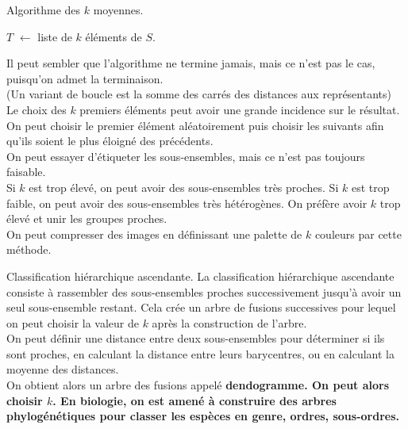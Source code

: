 \documentclass[french, 11pt]{article}
\begin{document}
\begin{ex}{Algorithme des $k$ moyennes.}{}
    \begin{algorithm}[H]
        \caption{$k$ moyennes.}
        $T$ $\gets$ liste de $k$ éléments de $S$.\\
    \end{algorithm}
    Il peut sembler que l'algorithme ne termine jamais, mais ce n'est pas le cas, puisqu'on admet la terminaison.\\
    (Un variant de boucle est la somme des carrés des distances aux représentants)\\
    Le choix des $k$ premiers éléments peut avoir une grande incidence sur le résultat.\\
    On peut choisir le premier élément aléatoirement puis choisir les suivants afin qu'ils soient le plus éloigné des précédents.\\
    On peut essayer d'étiqueter les sous-ensembles, mais ce n'est pas toujours faisable.\\
    Si $k$ est trop élevé, on peut avoir des sous-ensembles très proches. Si $k$ est trop faible, on peut avoir des sous-ensembles très hétérogènes. On préfère avoir $k$ trop élevé et unir les groupes proches.\\
    On peut compresser des images en définissant une palette de $k$ couleurs par cette méthode. 
\end{ex}

\begin{ex}{Classification hiérarchique ascendante.}{}
    La classification hiérarchique ascendante consiste à rassembler des sous-ensembles proches successivement jusqu'à avoir un seul sous-ensemble restant. Cela crée un arbre de fusions successives pour lequel on peut choisir la valeur de $k$ après la construction de l'arbre.\\
    On peut définir une distance entre deux sous-ensembles pour déterminer si ils sont proches, en calculant la distance entre leurs barycentres, ou en calculant la moyenne des distances.\\
    On obtient alors un arbre des fusions appelé \bf{dendogramme}. On peut alors choisir $k$. En biologie, on est amené à construire des arbres phylogénétiques pour classer les espèces en genre, ordres, sous-ordres.
\end{ex}
\end{document}
